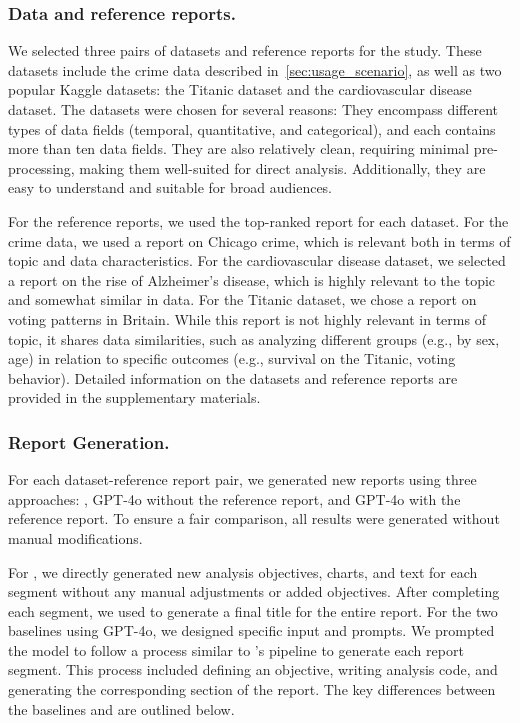 \subsubsection{Data and reference reports. }
We selected three pairs of datasets and reference reports for the study. 
These datasets include the crime data described in~\autoref{sec:usage_scenario}, as well as two popular Kaggle datasets: the Titanic dataset and the cardiovascular disease dataset. 
The datasets were chosen for several reasons: 
They encompass different types of data fields (temporal, quantitative, and categorical), and each contains more than ten data fields. 
They are also relatively clean, requiring minimal pre-processing, making them well-suited for direct analysis. 
Additionally, they are easy to understand and suitable for broad audiences.

For the reference reports, we used the top-ranked report for each dataset. 
For the crime data, we used a report on Chicago crime, which is relevant both in terms of topic and data characteristics. 
For the cardiovascular disease dataset, we selected a report on the rise of Alzheimer's disease, which is highly relevant to the topic and somewhat similar in data. 
For the Titanic dataset, we chose a report on voting patterns in Britain. 
While this report is not highly relevant in terms of topic, it shares data similarities, such as analyzing different groups (e.g., by sex, age) in relation to specific outcomes (e.g., survival on the Titanic, voting behavior).
Detailed information on the datasets and reference reports are provided in the supplementary materials. 

\subsubsection{Report Generation. }
For each dataset-reference report pair, we generated new reports using three approaches: \system{}, GPT-4o without the reference report, and GPT-4o with the reference report. 
To ensure a fair comparison, all results were generated without manual modifications.

For \system{}, we directly generated new analysis objectives, charts, and text for each segment without any manual adjustments or added objectives.
After completing each segment, we used \system{} to generate a final title for the entire report. 
For the two baselines using GPT-4o, we designed specific input and prompts. 
We prompted the model to follow a process similar to \system{}'s pipeline to generate each report segment. 
This process included defining an objective, writing analysis code, and generating the corresponding section of the report. 
The key differences between the baselines and \system{} are outlined below.


